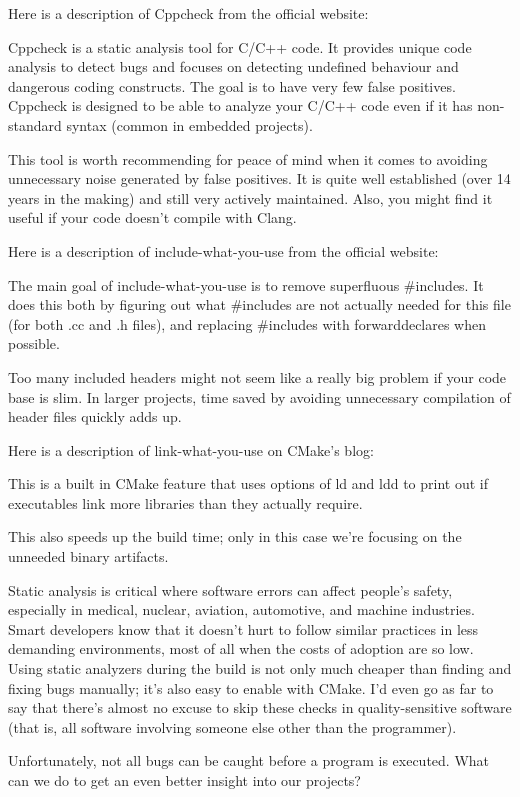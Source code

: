 
Here is a description of Cppcheck from the official website:

Cppcheck is a static analysis tool for C/C++ code. It provides unique code analysis to detect bugs and focuses on detecting undefined behaviour and dangerous coding constructs. The goal is to have very few false positives. Cppcheck is designed to be able to analyze your C/C++ code even if it has non-standard syntax (common in embedded projects).

This tool is worth recommending for peace of mind when it comes to avoiding unnecessary noise generated by false positives. It is quite well established (over 14 years in the making) and still very actively maintained. Also, you might find it useful if your code doesn't compile with Clang.



Here is a description of include-what-you-use from the official website:

The main goal of include-what-you-use is to remove superfluous \#includes. It does this both by figuring out what \#includes are not actually needed for this file (for both .cc and .h files), and replacing \#includes with forwarddeclares when possible.

Too many included headers might not seem like a really big problem if your code base is slim. In larger projects, time saved by avoiding unnecessary compilation of header files quickly adds up.


Here is a description of link-what-you-use on CMake's blog:

This is a built in CMake feature that uses options of ld and ldd to print out if executables link more libraries than they actually require.

This also speeds up the build time; only in this case we're focusing on the unneeded binary artifacts.

Static analysis is critical where software errors can affect people's safety, especially in medical, nuclear, aviation, automotive, and machine industries. Smart developers know that it doesn't hurt to follow similar practices in less demanding environments, most of all when the costs of adoption are so low. Using static analyzers during the build is not only much cheaper than finding and fixing bugs manually; it's also easy to enable with CMake. I'd even go as far to say that there's almost no excuse to skip these checks in quality-sensitive software (that is, all software involving someone else other than the programmer).

Unfortunately, not all bugs can be caught before a program is executed. What can we do to get an even better insight into our projects?


